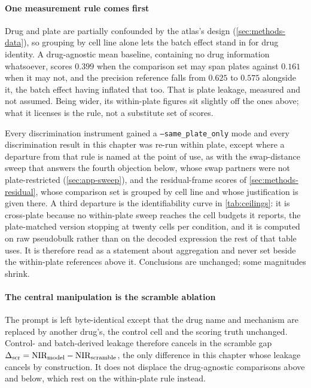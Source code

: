 \paragraph{One measurement rule comes first} Drug and plate are partially
confounded by the atlas's design
(\cref{sec:methods-data}), so grouping by cell line alone lets the batch effect
stand in for drug identity. A drug-agnostic mean baseline, containing no drug
information whatsoever, scores $0.399$ when the comparison set may span plates
against $0.161$ when it may not, and the precision reference falls from $0.625$
to $0.575$ alongside it, the batch
effect having inflated that too. That is plate leakage, measured and not
assumed. Being wider, its within-plate figures sit slightly off the ones above;
what it licenses is the rule, not a substitute set of scores.

\begin{scopelimit}
Every discrimination instrument gained a \texttt{--same\_plate\_only} mode and
every discrimination result in this chapter was re-run within plate, except
where a departure from that rule is named at the point of use, as with the
swap-distance sweep that answers the fourth objection below, whose swap partners
were not plate-restricted (\cref{sec:app-sweep}), and the residual-frame scores
of \cref{sec:methods-residual}, whose comparison set is grouped by cell line and
whose justification is given there. A third departure is the identifiability
curve in \cref{tab:ceilings}: it is cross-plate because no within-plate sweep
reaches the cell budgets it reports, the plate-matched version stopping at
twenty cells per condition, and it is computed on raw pseudobulk rather than on
the decoded expression the rest of that table uses. It is therefore read as a
statement about aggregation and never set beside the within-plate references
above it. Conclusions are unchanged; some magnitudes shrink.
\end{scopelimit}

\paragraph{The central manipulation is the scramble ablation} The prompt is left
byte-identical except that the drug name and mechanism are replaced by another
drug's, the control cell and the scoring truth unchanged. Control- and batch-derived leakage therefore cancels in
the scramble gap $\Delta_{\textrm{scr}} = \textrm{NIR}_{\textrm{model}} - \textrm{NIR}_{\textrm{scramble}}$, the
only difference in this chapter whose leakage cancels by construction. It does
not displace the drug-agnostic comparisons above and below, which rest on the
within-plate rule instead.

